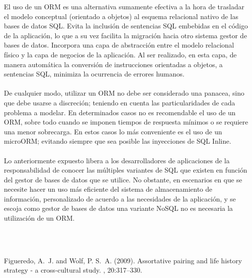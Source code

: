 \documentclass[twoside,twocolumn]{article}
\begin{document}
\begin{flushright}
\begin{itemize}
El uso de un ORM es una alternativa sumamente efectiva a la hora de trasladar el modelo conceptual (orientado a objetos) al esquema relacional nativo de las bases de datos SQL. Evita la inclusión de sentencias SQL embebidas en el código de la aplicación, lo que a su vez facilita la migración hacia otro sistema gestor de bases de datos. Incorpora una capa de abstracción entre el modelo relacional físico y la capa de negocios de la aplicación. Al ser realizado, en esta capa, de manera automática la conversión de instrucciones orientadas a objetos, a sentencias SQL, minimiza la ocurrencia de errores humanos.\textbf{}\\
\textbf{}\\
De cualquier modo, utilizar un ORM no debe ser considerado una panacea, sino que debe usarse a discreción; teniendo en cuenta las particularidades de cada problema a modelar. En determinados casos no es recomendable el uso de un ORM, sobre todo cuando se imponen tiempos de respuesta mínimos o se requiere una menor sobrecarga. En estos casos lo más conveniente es el uso de un microORM; evitando siempre que sea posible las inyecciones de SQL Inline.\textbf{}\\
\textbf{}\\
Lo anteriormente expuesto libera a los desarrolladores de aplicaciones de la responsabilidad de conocer las múltiples variantes de SQL que existen en función del gestor de bases de datos que se utilice. No obstante, en escenarios en que se necesite hacer un uso más eficiente del sistema de almacenamiento de información, personalizado de acuerdo a las necesidades de la aplicación, y se escoja como gestor de bases de datos una variante NoSQL no es necesaria la utilización de un ORM. 



\textbf{}\\
\textbf{}\\

\begin{thebibliography}{99} %

Figueredo, A.~J. and Wolf, P. S.~A. (2009).
\newblock Assortative pairing and life history strategy - a cross-cultural
  study.
, 20:317--330.
 
\end{thebibliography}

\end{itemize}
\end{flushright}
\end{document}
